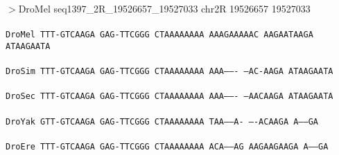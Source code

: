 \documentclass[11pt,twoside,reqno,a4paper]{article}
\begin{document}
\noindent
\newlength{\charwidth}$>$DroMel	seq1397\_2R\_19526657\_19527033	chr2R	19526657	19527033 \\
 \\
\texttt{DroMel	TTT-GTCAAGA	GAG-TTCGGG	CTAAAAAAAA	AAAGAAAAAC	AAGAATAAGA	ATAAGAATA\\
\hspace*{7\charwidth}\hspace*{1\charwidth}\hspace*{1\charwidth}\hspace*{1\charwidth}\hspace*{1\charwidth}\hspace*{1\charwidth}\\
DroSim	TTT-GTCAAGA	GAG-TTCGGG	CTAAAAAAAA	AAA-------	---AC-AAGA	ATAAGAATA\\
\hspace*{7\charwidth}\hspace*{1\charwidth}\hspace*{1\charwidth}\hspace*{1\charwidth}\hspace*{1\charwidth}\hspace*{1\charwidth}\\
DroSec	TTT-GTCAAGA	GAG-TTCGGG	CTAAAAAAAA	AAA-------	---AACAAGA	ATAAGAATA\\
\hspace*{7\charwidth}\hspace*{1\charwidth}\hspace*{1\charwidth}\hspace*{1\charwidth}\hspace*{1\charwidth}\hspace*{1\charwidth}\\
DroYak	GTT-GTCAAGA	GAG-TTCGGG	CTAAAAAAAA	TAA-----A-	----ACAAGA	A------GA\\
\hspace*{7\charwidth}\hspace*{1\charwidth}\hspace*{1\charwidth}\hspace*{1\charwidth}\hspace*{1\charwidth}\hspace*{1\charwidth}\\
DroEre	TTT-GTCAAGA	GAG-TTCGGG	CTAAAAAAAA	ACA-----AG	AAGAAGAAGA	A------GA\\
\hspace*{7\charwidth}\hspace*{1\charwidth}\hspace*{1\charwidth}\hspace*{1\charwidth}\hspace*{1\charwidth}\hspace*{1\charwidth}\\
}
\end{document}

